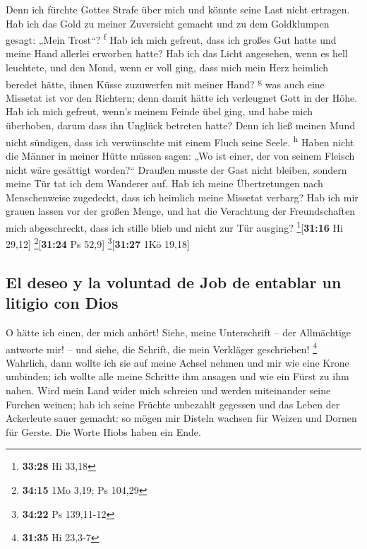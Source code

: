  Denn ich fürchte Gottes Strafe über mich und könnte
seine Last nicht ertragen.  Hab ich das Gold zu meiner
Zuversicht gemacht und zu dem Goldklumpen gesagt: „Mein Trost``?
\textsuperscript{f}  Hab ich mich gefreut, dass ich
großes Gut hatte und meine Hand allerlei erworben hatte? 
Hab ich das Licht angesehen, wenn es hell leuchtete, und den Mond, wenn
er voll ging,  dass mich mein Herz heimlich beredet
hätte, ihnen Küsse zuzuwerfen mit meiner Hand? \textsuperscript{g}
 was auch eine Missetat ist vor den Richtern; denn damit
hätte ich verleugnet Gott in der Höhe.  Hab ich mich
gefreut, wenn's meinem Feinde übel ging, und habe mich überhoben, darum
dass ihn Unglück betreten hatte?  Denn ich ließ meinen
Mund nicht sündigen, dass ich verwünschte mit einem Fluch seine Seele.
\textsuperscript{h}  Haben nicht die Männer in meiner
Hütte müssen sagen: „Wo ist einer, der von seinem Fleisch nicht wäre
gesättigt worden?{}``  Draußen musste der Gast nicht
bleiben, sondern meine Tür tat ich dem Wanderer auf.  Hab
ich meine Übertretungen nach Menschenweise zugedeckt, dass ich heimlich
meine Missetat verbarg?  Hab ich mir grauen lassen vor
der großen Menge, und hat die Verachtung der Freundschaften mich
abgeschreckt, dass ich stille blieb und nicht zur Tür ausging?
\footnote{\textbf{33:28} Hi 33,18}{[}\textbf{31:16} Hi 29,12{]}
\footnote{\textbf{34:15} 1Mo 3,19; Ps 104,29}{[}\textbf{31:24} Ps
52,9{]} \footnote{\textbf{34:22} Ps 139,11-12}{[}\textbf{31:27} 1Kö
19,18{]}

\hypertarget{el-deseo-y-la-voluntad-de-job-de-entablar-un-litigio-con-dios}{%
\subsection{El deseo y la voluntad de Job de entablar un litigio con
Dios}\label{el-deseo-y-la-voluntad-de-job-de-entablar-un-litigio-con-dios}}

 O hätte ich einen, der mich anhört! Siehe, meine
Unterschrift -- der Allmächtige antworte mir! -- und siehe, die Schrift,
die mein Verkläger geschrieben! \footnote{\textbf{31:35} Hi 23,3-7}
 Wahrlich, dann wollte ich sie auf meine Achsel nehmen
und mir wie eine Krone umbinden;  ich wollte alle meine
Schritte ihm ansagen und wie ein Fürst zu ihm nahen. 
Wird mein Land wider mich schreien und werden miteinander seine Furchen
weinen;  hab ich seine Früchte unbezahlt gegessen und das
Leben der Ackerleute sauer gemacht:  so mögen mir Disteln
wachsen für Weizen und Dornen für Gerste. Die Worte Hiobs haben ein
Ende.

